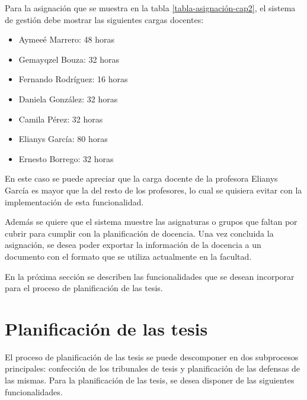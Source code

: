 Para la asignación que se muestra en la tabla \ref{tabla-asignación-cap2}, 
el sistema de gestión debe mostrar las siguientes cargas docentes:

\begin{multicols}{2}
    \begin{itemize}
        \item Aymeeé Marrero: 48 horas
        \item Gemayqzel Bouza: 32 horas 
        \item Fernando Rodríguez: 16 horas 
        \item Daniela González: 32 horas 
        \item Camila Pérez: 32 horas
        \item Elianys García: 80 horas
        \item Ernesto Borrego: 32 horas 
    \end{itemize}
\end{multicols}

En este caso se puede apreciar que la carga docente de la profesora 
Elianys García es mayor que la del resto de los profesores, lo cual se 
quisiera evitar con la implementación de esta funcionalidad. 


Además se quiere que el sistema muestre las asignaturas o 
grupos que faltan por cubrir para cumplir con la planificación de docencia. 
Una vez concluida la asignación, se desea poder exportar la información de la docencia a un documento con el 
formato que se utiliza actualmente en la facultad. 







En la próxima sección se describen las funcionalidades que se desean incorporar para el 
proceso de planificación de las tesis.


\section{Planificación de las tesis}
El proceso de planificación de las tesis se puede descomponer en dos subprocesos principales: 
confección de los tribunales de tesis y planificación de las defensas de las mismas.
Para la planificación de las tesis, se desea disponer de las siguientes funcionalidades.



